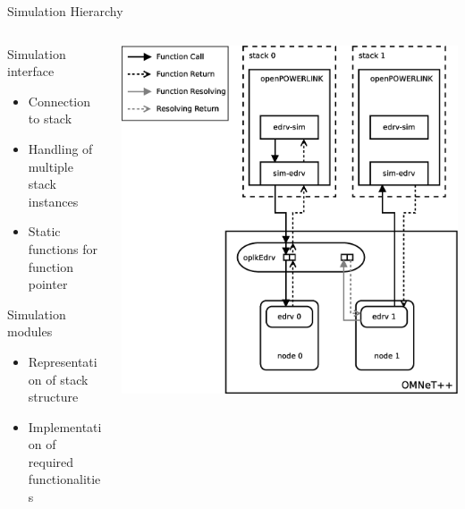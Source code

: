 \begin{frame}{Simulation Hierarchy}
    \begin{columns}
        \begin{column}{0.43\textwidth}
            \begin{block}{Simulation interface}
                {\scriptsize
                     \begin{itemize}
                    \item Connection to stack
                    \item Handling of multiple stack instances
                    \item Static functions for function pointer
                \end{itemize}}
            \end{block}
            \begin{block}{Simulation modules}
                {\scriptsize
                \begin{itemize}
                    \item Representation of stack structure
                    \item Implementation of required functionalities
                \end{itemize}}
            \end{block}
        \end{column}
        \begin{column}{0.57\textwidth}
            \includegraphics[height=0.85\textheight]{../../thesis/images/simulation_instances.eps}
        \end{column}
    \end{columns}
\end{frame}

